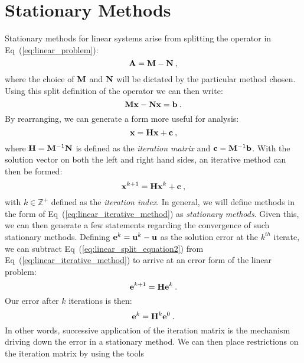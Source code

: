 \section{Stationary Methods\ }
\label{sec:stationary_methods}
Stationary methods for linear systems arise from splitting the
operator in Eq~(\ref{eq:linear_problem}):
\begin{equation}
  \mathbf{A} = \mathbf{M} - \mathbf{N}\:,
  \label{eq:split_linear_operator}
\end{equation}
where the choice of $\mathbf{M}$ and $\mathbf{N}$ will be dictated by the
particular method chosen. Using this split definition of the operator
we can then write:
\begin{equation}
  \mathbf{M}\mathbf{x} - \mathbf{N}\mathbf{x} = \mathbf{b}\:.
  \label{eq:linear_split_equation1}
\end{equation}
By rearranging, we can generate a form more useful for analysis:
\begin{equation}
  \mathbf{x} = \mathbf{H}\mathbf{x} + \mathbf{c}\:,
  \label{eq:linear_split_equation2}
\end{equation}
where $\mathbf{H}=\mathbf{M}^{-1}\mathbf{N}$ is defined as the \textit{iteration
  matrix} and $\mathbf{c}=\mathbf{M}^{-1}\mathbf{b}$. With the solution vector on
both the left and right hand sides, an iterative method can then be
formed:
\begin{equation}
    \mathbf{x}^{k+1} = \mathbf{H}\mathbf{x}^k + \mathbf{c}\:,
  \label{eq:linear_iterative_method}
\end{equation}
with $k \in \mathbb{Z}^+$ defined as the \textit{iteration index}. In
general, we will define methods in the form of
Eq~(\ref{eq:linear_iterative_method}) as \textit{stationary
  methods}. Given this, we can then generate a few statements
regarding the convergence of such stationary methods. Defining
$\mathbf{e}^k = \mathbf{u}^k - \mathbf{u}$ as the solution error at the
$k^{th}$ iterate, we can subtract Eq~(\ref{eq:linear_split_equation2})
from Eq~(\ref{eq:linear_iterative_method}) to arrive at an error form
of the linear problem:
\begin{equation}
  \mathbf{e}^{k+1} = \mathbf{H}\mathbf{e}^k\:. 
  \label{eq:linear_iterative_error}
\end{equation}
Our error after $k$ iterations is then:
\begin{equation}
  \mathbf{e}^{k} = \mathbf{H}^k\mathbf{e}^0\:. 
  \label{eq:linear_k_iter_error}
\end{equation}
In other words, successive application of the iteration matrix is the
mechanism driving down the error in a stationary method. We can then
place restrictions on the iteration matrix by using the tools
